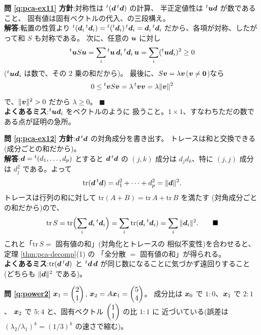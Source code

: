 \bigskip
\noindent\textbf{問 \ref{q:pca-ex11}}\quad
\textbf{方針}:対称性は ${}^t(\bm{d}\,{}^t\bm{d})$ の計算、
半正定値性は ${}^t\bm{u}\bm{d}$ が数であること、
固有値は固有ベクトルの代入、の三段構え。\\
\textbf{解答}:転置の性質より
${}^t(\bm{d}_i\,{}^t\bm{d}_i)
= {}^t({}^t\bm{d}_i)\,{}^t\bm{d}_i = \bm{d}_i\,{}^t\bm{d}_i$
だから、各項が対称、したがって和 $S$ も対称である。
次に、任意の $\bm{u}$ に対し
\[
{}^t\bm{u}S\bm{u}
= \sum_i {}^t\bm{u}\,\bm{d}_i\,{}^t\bm{d}_i\,\bm{u}
= \sum_i ({}^t\bm{u}\bm{d}_i)^2 \ge 0
\]
($ {}^t\bm{u}\bm{d}_i$ は数で、その $2$ 乗の和だから)。
最後に、$S\bm{v} = \lambda\bm{v}$($\bm{v} \neq \bm{0}$)なら
\[
0 \le {}^t\bm{v}S\bm{v} = \lambda\,{}^t\bm{v}\bm{v}
= \lambda\|\bm{v}\|^2
\]
で、$\|\bm{v}\|^2 > 0$ だから $\lambda \ge 0$。 $\blacksquare$\\
\textbf{よくあるミス}:${}^t\bm{u}\bm{d}_i$ をベクトルのように
扱うこと。$1 \times 1$、すなわちただの数である点が証明の急所。

\bigskip
\noindent\textbf{問 \ref{q:pca-ex12}}\quad
\textbf{方針}:$\bm{d}\,{}^t\bm{d}$ の対角成分を書き出す。
トレースは和と交換できる(成分ごとの和だから)。\\
\textbf{解答}:$\bm{d} = {}^t(d_1, \dots, d_p)$ とすると
$\bm{d}\,{}^t\bm{d}$ の $(j, k)$ 成分は $d_j d_k$、特に
$(j, j)$ 成分は $d_j^2$ である。よって
\[
\mathrm{tr}(\bm{d}\,{}^t\bm{d}) = d_1^2 + \cdots + d_p^2
= \|\bm{d}\|^2.
\]
トレースは行列の和に対して
$\mathrm{tr}(A + B) = \mathrm{tr}\,A + \mathrm{tr}\,B$ を満たす
(対角成分ごとの和だから)ので、
\[
\mathrm{tr}\,S = \mathrm{tr}\Bigl(\sum_i \bm{d}_i\,{}^t\bm{d}_i\Bigr)
= \sum_i \mathrm{tr}(\bm{d}_i\,{}^t\bm{d}_i)
= \sum_i \|\bm{d}_i\|^2. \qquad\blacksquare
\]
これと「$\mathrm{tr}\,S = $ 固有値の和」(対角化とトレースの
相似不変性)を合わせると、定理 \ref{thm:pca-decomp}(1) の
「全分散 $=$ 固有値の和」が得られる。\\
\textbf{よくあるミス}:$\mathrm{tr}(\bm{d}\,{}^t\bm{d})$ と
${}^t\bm{d}\,\bm{d}$ が同じ数になることに気づかず遠回りすること
(どちらも $\|\bm{d}\|^2$ である)。

\bigskip
\noindent\textbf{問 \ref{q:power2}}\quad
$\bm{x}_1 = \begin{pmatrix}2 \\ 1\end{pmatrix}$, $\bm{x}_2 = A\bm{x}_1 = \begin{pmatrix}5 \\ 4\end{pmatrix}$。
成分比は $\bm{x}_0$ で $1 : 0$、$\bm{x}_1$ で $2 : 1$、
$\bm{x}_2$ で $5 : 4$ と、固有ベクトル $\begin{pmatrix}1 \\ 1\end{pmatrix}$ の比 $1 : 1$ に
近づいている(誤差は $(\lambda_2/\lambda_1)^k = (1/3)^k$ の速さで縮む)。

